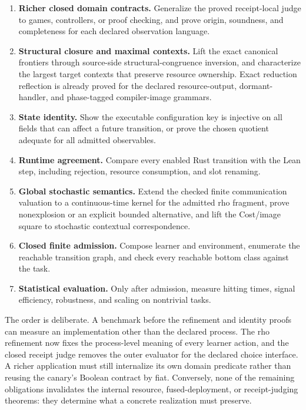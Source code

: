 \documentclass[11pt]{article}
\begin{document}
\begin{enumerate}
\item \textbf{Richer closed domain contracts.}  Generalize the proved
  receipt-local judge to games, controllers, or proof checking, and prove
  origin, soundness, and completeness for each declared observation language.
\item \textbf{Structural closure and maximal contexts.}  Lift the exact
  canonical frontiers through source-side structural-congruence inversion,
  and characterize the largest target contexts that preserve resource
  ownership.  Exact reduction reflection is already proved for the declared
  resource-output, dormant-handler, and phase-tagged compiler-image grammars.
\item \textbf{State identity.}  Show the executable configuration key is
  injective on all fields that can affect a future transition, or prove the
  chosen quotient adequate for all admitted observables.
\item \textbf{Runtime agreement.}  Compare every enabled Rust transition with
  the Lean step, including rejection, resource consumption, and slot
  renaming.
\item \textbf{Global stochastic semantics.}  Extend the checked finite
  communication valuation to a continuous-time kernel for the admitted rho
  fragment, prove nonexplosion or an explicit bounded alternative, and lift
  the Cost/image square to stochastic contextual correspondence.
\item \textbf{Closed finite admission.}  Compose learner and environment,
  enumerate the reachable transition graph, and check every reachable bottom
  class against the task.
\item \textbf{Statistical evaluation.}  Only after admission, measure hitting
  times, signal efficiency, robustness, and scaling on nontrivial tasks.
\end{enumerate}

The order is deliberate.  A benchmark before the refinement and identity
proofs can measure an implementation other than the declared process.  The
rho refinement now fixes the process-level meaning of every learner action,
and the closed receipt judge removes the outer evaluator for the declared
choice interface.  A richer application must still internalize its own domain
predicate rather than reusing the canary's Boolean contract by fiat.
Conversely, none of the remaining obligations invalidates the internal
resource, fused-deployment, or receipt-judging theorems: they determine what a
concrete realization must preserve.
\end{document}
